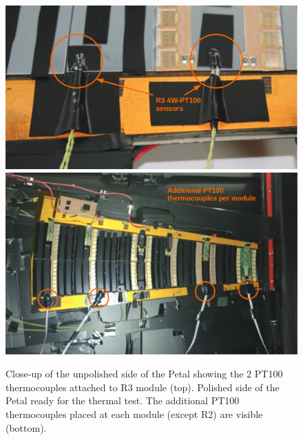 		\begin{figure}[H]
			\centering
			\captionsetup{justification=centering,margin=2cm}
			\includegraphics[scale=0.47]{Figures/Chapter02/R3PT100CloseUp.pdf}
			\includegraphics[scale=0.45]{Figures/Chapter02/AdditionalPT100perModule.pdf}
			\caption{Close-up of the unpolished side of the Petal showing the 2 PT100 thermocouples attached to R3 module (top). Polished side of the Petal ready for the thermal test. The additional PT100 thermocouples placed at each module (except R2) are visible (bottom).}\label{fig2.9}
		\end{figure}
